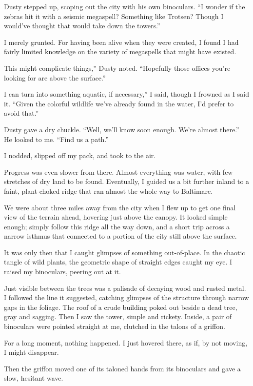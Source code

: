 Dusty stepped up, scoping out the city with his own binoculars. “I wonder if the zebras hit it with a seismic megaspell? Something like Trotsen? Though I would’ve thought that would take down the towers.”

I merely grunted. For having been alive when they were created, I found I had fairly limited knowledge on the variety of megaspells that might have existed.

\leavevmode{}This might complicate things,” Dusty noted. “Hopefully those offices you’re looking for are above the surface.”

\leavevmode{}I can turn into something aquatic, if necessary,” I said, though I frowned as I said it. “Given the colorful wildlife we’ve already found in the water, I’d prefer to avoid that.”

Dusty gave a dry chuckle. “Well, we’ll know soon enough. We’re almost there.” He looked to me. “Find us a path.”

I nodded, slipped off my pack, and took to the air.

Progress was even slower from there. Almost everything was water, with few stretches of dry land to be found. Eventually, I guided us a bit further inland to a faint, plant-choked ridge that ran almost the whole way to Baltimare.

We were about three miles away from the city when I flew up to get one final view of the terrain ahead, hovering just above the canopy. It looked simple enough; simply follow this ridge all the way down, and a short trip across a narrow isthmus that connected to a portion of the city still above the surface.

It was only then that I caught glimpses of something out-of-place. In the chaotic tangle of wild plants, the geometric shape of straight edges caught my eye. I raised my binoculars, peering out at it.

Just visible between the trees was a palisade of decaying wood and rusted metal. I followed the line it suggested, catching glimpses of the structure through narrow gaps in the foliage. The roof of a crude building poked out beside a dead tree, gray and sagging. Then I saw the tower, simple and rickety. Inside, a pair of binoculars were pointed straight at me, clutched in the talons of a griffon.

For a long moment, nothing happened. I just hovered there, as if, by not moving, I might disappear.

Then the griffon moved one of its taloned hands from its binoculars and gave a slow, hesitant wave.

